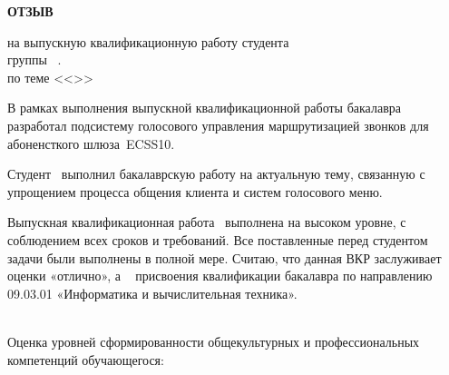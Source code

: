 
\vspace{0.1cm}
\begin{center}
    \LARGE
    {\bf ОТЗЫВ} \\
    \normalsize
\end{center}
\begin{center}
    на выпускную квалификационную работу студента \\
    группы \group\ \fio. \\
    по теме <<\topicname>>
\end{center}

В рамках выполнения выпускной квалификационной работы бакалавра \\ \fioa
разработал подсистему голосового управления маршрутизацией звонков для
абоненсткого шлюза~ECSS10.

Студент \fio~выполнил бакалаврскую работу на актуальную тему, связанную с
упрощением процесса общения клиента и систем голосового меню.

Выпускная квалификационная работа \fio\ выполнена на высоком уровне, с соблюдением
всех сроков и требований. Все поставленные перед студентом задачи были выполнены
в полной мере. Считаю, что данная ВКР заслуживает оценки «отлично», а \fio~
присвоения квалификации бакалавра по направлению 09.03.01 «Информатика и вычислительная техника».

\hfill \\

Оценка уровней сформированности общекультурных и профессиональных
компетенций обучающегося:

